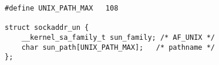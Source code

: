 
\begin{lstlisting}
#define UNIX_PATH_MAX	108

struct sockaddr_un {
	__kernel_sa_family_t sun_family; /* AF_UNIX */
	char sun_path[UNIX_PATH_MAX];	/* pathname */
};
\end{lstlisting}
